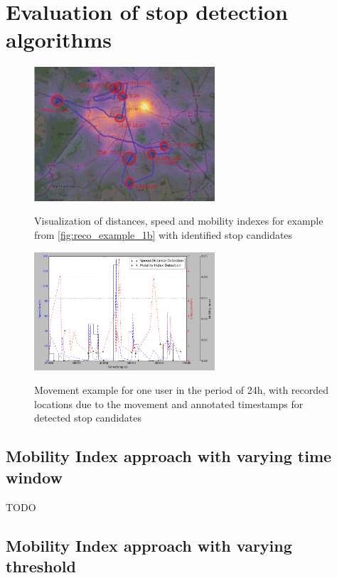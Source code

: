 \section{Evaluation of stop detection algorithms}

\begin{figure}[!ht]
	\centering
	\includegraphics[width=0.6\textwidth]{images/reco_example_1a.png}\\
	\caption{ Visualization of distances, speed and mobility indexes for example from \autoref{fig:reco_example_1b} with identified stop candidates }
	\label{fig:reco_example_1a}
\end{figure} 
\begin{figure}[!ht]
	\centering
	\includegraphics[width=0.6\textwidth]{images/reco_example_1b.png}\\
	\caption{ Movement example for one user in the period of 24h, with recorded locations due to the movement and annotated timestamps for detected stop candidates }
	\label{fig:reco_example_1b}
\end{figure}
\FloatBarrier

\subsection{Mobility Index approach with varying time window}

TODO

\subsection{Mobility Index approach with varying threshold}

